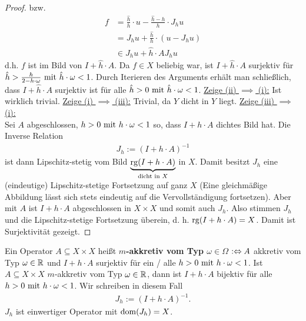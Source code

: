 \begin{proof}
	bzw. 
	\begin{align*}
		f&=\frac{\hat{h}}{h}\cdot u-\frac{\hat{h}-h}{h}\cdot J_h u\\
		&=J_h u+\frac{\hat{h}}{h}\cdot\left(u-J_h u\right)\\
		&\in J_h u+\hat{h}\cdot A J_h u
	\end{align*}
	d.h. $f$ ist im Bild von $I+\hat{h}\cdot A$. 
	Da $f\in X$ beliebig war, ist $I+\hat{h}\cdot A$ surjektiv für $\hat{h}>\frac{h}{2-h\cdot\omega}\mit \hat{h}\cdot\omega<1$. 
	Durch Iterieren des Arguments erhält man schließlich, dass $I+\hat{h}\cdot A$ surjektiv ist für alle $\hat{h}>0\mit\hat{h}\cdot\omega<1$.\nl
	\underline{Zeige (ii) $\implies$ (i):} Ist wirklich trivial.\nl
	\underline{Zeige (i) $\implies$ (iii):} Trivial, da $Y$ dicht in $Y$ liegt.\nl
	\underline{Zeige (iii) $\implies$ (i):}\\
	Sei $A$ abgeschlossen, $h>0\mit h\cdot\omega<1$ so, dass $I+h\cdot A$ dichtes Bild hat. 
	Die Inverse Relation
	\begin{align*}
		J_h:=(I+h\cdot A)^{-1}
	\end{align*}
	ist dann Lipschitz-stetig vom Bild $\underbrace{\rg(I+h\cdot A)}_{\text{dicht in }X}$ in $X$. 
	Damit besitzt $J_h$ eine (eindeutige) Lipschitz-stetige Fortsetzung auf ganz $X$ 
	(Eine gleichmäßige Abbildung lässt sich stets eindeutig auf die Vervollständigung fortsetzen). 
	Aber mit $A$ ist $I+h\cdot A$ abgeschlossen in $X\times X$ und somit auch $J_h$. 
	Also stimmen $J_h$ und die Lipschitz-stetige Fortsetzung überein, d. h. $\rg(I+h\cdot A)=X$. 
	Damit ist Surjektivität gezeigt.
\end{proof}

\begin{definition}
	Ein Operator $A\subseteq X\times X$ heißt \textbf{$m$-akkretiv vom Typ $\omega\in\Omega$} $:\gdw\\ A$ akkretiv vom Typ $\omega\in\R$ und $I+h\cdot A$ surjektiv für ein / alle $h>0\mit h\cdot\omega<1$.\nl
	Ist $A\subseteq X\times X$  $m$-akkretiv vom Typ $\omega\in\R$, dann ist $I+h\cdot A$ bijektiv für alle $h>0\mit h\cdot\omega<1$. 
	Wir schreiben in diesem Fall
	\begin{align*}
		J_h:=(I+h\cdot A)^{-1}.
	\end{align*}
	$J_h$ ist einwertiger Operator mit $\dom(J_h)=X$.
\end{definition}

